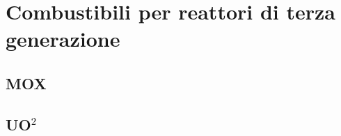 \chapter{Combustibili per reattori di terza generazione}\label{ch:3gen}

\section{MOX}

\section{UO$^2$}